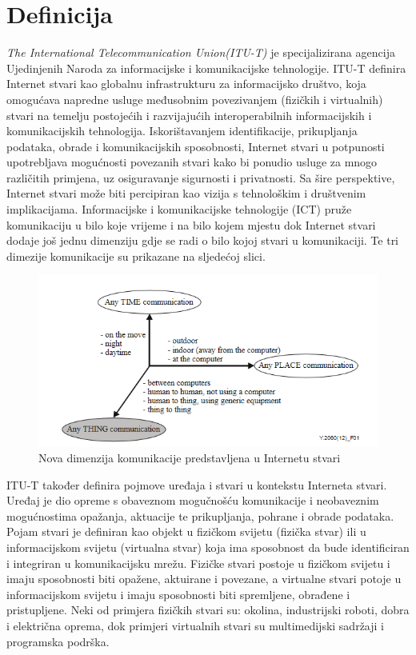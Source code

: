 \documentclass[times, utf8, diplomski]{fer}
\begin{document}
\section{Definicija}
\emph{The International Telecommunication Union(ITU-T)} je specijalizirana agencija Ujedinjenih Naroda za informacijske i komunikacijske tehnologije. ITU-T definira Internet stvari kao globalnu infrastrukturu za informacijsko društvo, koja omogućava napredne usluge međusobnim povezivanjem (fizičkih i virtualnih) stvari na temelju postojećih i razvijajućih interoperabilnih informacijskih i komunikacijskih tehnologija. Iskorištavanjem identifikacije, prikupljanja podataka, obrade i komunikacijskih sposobnosti, Internet stvari u potpunosti upotrebljava mogućnosti povezanih stvari kako bi ponudio usluge za mnogo različitih primjena, uz osiguravanje sigurnosti i privatnosti. Sa šire perspektive, Internet stvari može biti percipiran kao vizija s tehnološkim i društvenim implikacijama.\citep{ITU-T/IoT} Informacijske i komunikacijske tehnologije (ICT) pruže komunikaciju u bilo koje vrijeme i na bilo kojem mjestu dok Internet stvari dodaje još jednu dimenziju gdje se radi o bilo kojoj stvari u komunikaciji. Te tri dimezije komunikacije su prikazane na sljedećoj slici.
\begin{figure}[htb]
    \centering
    \includegraphics[width=14cm]{images/3dimenzije.png}
    \caption{Nova dimenzija komunikacije predstavljena u Internetu stvari\citep{ITU-T/IoT}}
    \label{fig:3-dim}
\end{figure}

ITU-T također definira pojmove uređaja i stvari u kontekstu Interneta stvari. Uređaj je dio opreme s obaveznom mogučnošću komunikacije i neobaveznim mogućnostima opažanja, aktuacije te prikupljanja, pohrane i obrade podataka. Pojam stvari je definiran kao objekt u fizičkom svijetu (fizička stvar) ili u informacijskom svijetu (virtualna stvar) koja ima sposobnost da bude identificiran i integriran u komunikacijsku mrežu. Fizičke stvari postoje u fizičkom svijetu i imaju sposobnosti biti opažene, aktuirane i povezane, a virtualne stvari potoje u informacijskom svijetu i imaju sposobnosti biti spremljene, obrađene i pristupljene. Neki od primjera fizičkih stvari su: okolina, industrijski roboti, dobra i električna oprema, dok primjeri virtualnih stvari su multimedijski sadržaji i programska podrška.
\end{document}
